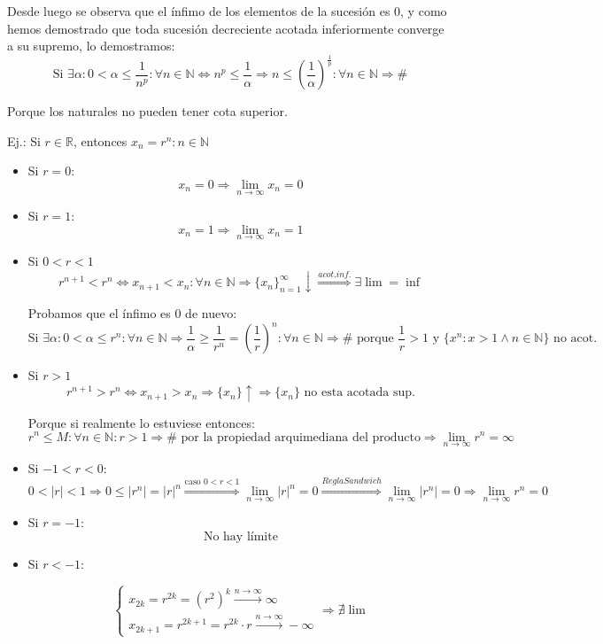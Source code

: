 \documentclass[10pt,a4paper,openright]{book}
\begin{document}
Desde luego se observa que el ínfimo de los elementos de la sucesión es 0, y como hemos demostrado que toda sucesión decreciente acotada inferiormente converge a su supremo, lo demostramos:
$$\mbox{Si }\exists \alpha: 0<\alpha\leq \frac{1}{n^p}: \forall n\in \mathbb N\Leftrightarrow n^p\leq \frac{1}{\alpha}\Rightarrow n\leq (\frac{1}{\alpha})^{\frac{1}{p}}: \forall n \in \mathbb N\Rightarrow \#$$

Porque los naturales no pueden tener cota superior.

Ej.: Si $r\in \mathbb R$, entonces $x_n=r^n: n\in \mathbb N$
\begin{itemize}
\item Si $r=0$:
$$x_n=0\Rightarrow \lim_{n\rightarrow \infty}x_n=0$$

\item Si $r=1$:
$$x_n=1\Rightarrow \lim_{n\rightarrow \infty}x_n=1$$

\item Si $0<r<1$
$$r^{n+1}<r^n\Leftrightarrow x_{n+1}<x_n: \forall n\in \mathbb N\Rightarrow \{x_n\}_{n=1}^\infty \downarrow \stackrel{acot. inf.}\Rightarrow \exists \lim =\inf$$

Probamos que el ínfimo es 0 de nuevo:
$$\mbox{Si }\exists\alpha: 0<\alpha \leq r^n: \forall n\in \mathbb N\Rightarrow \frac{1}{\alpha}\geq\frac{1}{r^n}=\left(\frac{1}{r}\right)^n:\forall n\in \mathbb N\Rightarrow \# \mbox{ porque }\frac{1}{r}>1 \mbox{ y }\{x^n: x>1\wedge n\in \mathbb N\}\mbox{ no acot.}$$

\item Si $r>1$
$$r^{n+1}>r^n\Leftrightarrow x_{n+1}>x_n\Rightarrow \{x_n\}\uparrow \Rightarrow \{x_n\}\mbox{ no esta acotada sup.}$$

Porque si realmente lo estuviese entonces:
$$r^n\leq M: \forall n\in \mathbb N: r>1\Rightarrow \#\mbox{ por la propiedad arquimediana del producto}\Rightarrow \lim_{n\rightarrow\infty} r^n=\infty$$

\item Si $-1<r<0$:
$$0<|r|<1\Rightarrow 0\leq |r^n|=|r|^n\stackrel{\mbox{caso } 0<r<1}{\Rightarrow }\lim_{n\rightarrow \infty} |r|^n=0\stackrel{Regla Sandwich}{\Rightarrow} \lim_{n\rightarrow \infty} |r^n|=0\Rightarrow \lim_{n\rightarrow \infty} r^n=0$$

\item Si $r=-1$:
$$\mbox{No hay límite}$$

\item Si $r<-1$:

$$\begin{cases}x_{2k}=r^{2k}=(r^2)^k\stackrel{n\rightarrow \infty}{\rightarrow} \infty \\
x_{2k+1}=r^{2k+1}=r^{2k}\cdot r \stackrel{n\rightarrow \infty}{\rightarrow} -\infty\end{cases}\Rightarrow \nexists \lim$$
\end{itemize}
\end{document}
